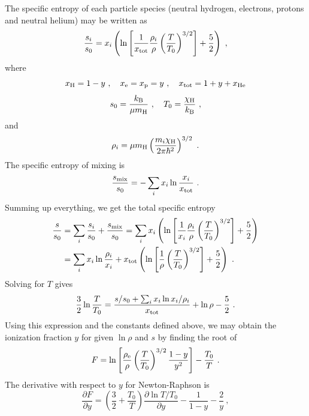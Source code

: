 \documentclass[\mydriver,12pt,twoside,notitlepage,a4paper]{article}
\begin{document}
The specific entropy of each particle species (neutral hydrogen, electrons, protons and neutral helium) may be written as
\begin{equation}
\frac{s_i}{s_0}=x_i\left(\ln\left[\frac{1}{x_{\rm tot}}
\frac{\rho_i}{\rho}\left(\frac{T}{T_0}\right)^{3/2}\right]
+\frac{5}{2}\right)\ ,
\end{equation}
where
\begin{equation}
x_{\rm H}=1-y\ ,\quad x_{\rm e}=x_{\rm p}=y\ ,\quad x_{\rm tot}=1+y+x_{\rm He}
\end{equation}
\begin{equation}
s_0=\frac{k_{\rm B}}{\mu m_{\rm H}}\ ,\quad
T_0=\frac{\chi_{\rm H}}{k_{\rm B}}\ ,
\end{equation}
and
\begin{equation}
\rho_i=\mu m_{\rm H}\left(\frac{m_i\chi_{\rm H}}{2\pi\hbar^2}\right)^{3/2}\ .
\end{equation}
The specific entropy of mixing is
\begin{equation}
\frac{s_{\rm mix}}{s_0}=-\sum_ix_i\ln\frac{x_i}{x_{\rm tot}}\ .
\end{equation}
Summing up everything, we get the total specific entropy 
\begin{align}
\frac{s}{s_0}&=\sum_i\frac{s_i}{s_0}+\frac{s_{\rm mix}}{s_0}
=\sum_ix_i\left(\ln\left[\frac{1}{x_i}\frac{\rho_i}{\rho}
\left(\frac{T}{T_0}\right)^{3/2}\right]+\frac{5}{2}\right)\\
&=\sum_ix_i\ln\frac{\rho_i}{x_i}
+x_{\rm tot}\left(\ln\left[\frac{1}{\rho}
\left(\frac{T}{T_0}\right)^{3/2}\right]+\frac{5}{2}\right)\ .
\end{align}
Solving for $T$ gives
\begin{equation}
\frac{3}{2}\ln\frac{T}{T_0}=\frac{s/s_0
+\sum_ix_i\ln x_i/\rho_i}{x_{\rm tot}}
+\ln\rho-\frac{5}{2}\ .
\end{equation}
Using this expression and the constants defined above, we may obtain the
ionization fraction $y$ for given $\ln\rho$ and $s$ by finding the root of
\begin{equation}
F=\ln\left[\frac{\rho_{\rm e}}{\rho}\left(\frac{T}{T_0}\right)^{3/2}
           \frac{1-y}{y^2}\right]-\frac{T_0}{T}\ .
\end{equation}
The derivative with respect to $y$ for Newton-Raphson is
\begin{equation}
\frac{\partial F}{\partial y}
=\left(\frac{3}{2}+\frac{T_0}{T}\right)\frac{\partial\ln T/T_0}{\partial y}
 -\frac{1}{1-y}-\frac{2}{y}\ ,
\end{equation}
\end{document}
